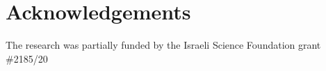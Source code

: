


\maketitle








\section{Acknowledgements}
The research was partially funded by the Israeli Science Foundation grant \#2185/20






% 

